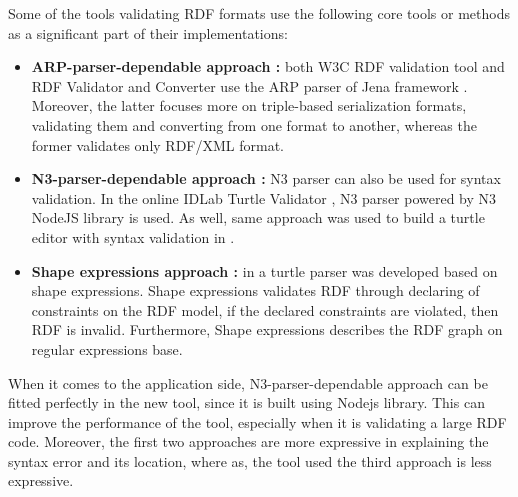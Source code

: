 Some of the tools validating RDF formats use the following core tools or methods as a significant part of their implementations: \begin{itemize}[noitemsep] 
	\item \textbf{ARP-parser-dependable approach :} both W3C RDF validation tool \cite{W3C:Validation:Online} and RDF Validator and Converter \cite{Mybluemix:Validation:Online} use the ARP parser of Jena framework \cite{McBride:2002:JSW:613357.613755}. Moreover, the latter focuses more on triple-based serialization formats, validating them and converting from one format to another, whereas the former validates only RDF/XML format. 
	\item \textbf{N3-parser-dependable approach :} N3 parser \cite{N3Parser:Online} can also be used for syntax validation. In the online IDLab Turtle Validator \cite{IDLab:Validation:Online}, N3 parser powered by N3 NodeJS library is used. As well, same approach was used to build a turtle editor with syntax validation in \cite{petersenturtleeditor}. 
	\item \textbf{Shape expressions approach :} in \cite{prud2014shape} a turtle parser was developed based on shape expressions. Shape expressions validates RDF through declaring of constraints on the RDF model, if the declared constraints are violated, then RDF is invalid. Furthermore, Shape expressions describes the RDF graph on regular expressions base. 
\end{itemize} 

\par
When it comes to the application side, N3-parser-dependable approach can be fitted perfectly in the new tool, since it is built using Nodejs library. This can improve the performance of the tool, especially when it is validating a large RDF code. Moreover, the first two approaches are more expressive in explaining the syntax error and its location, where as, the tool used the third approach is less expressive.

